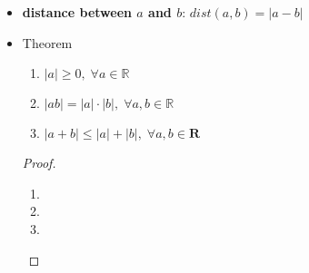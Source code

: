 \documentclass[12pt]{article}
\begin{document}
\begin{enumerate}
\begin{itemize}
\begin{enumerate}
	\item If $0\leq a$ and $0\leq b$ then $0\leq ab$
	\item $\forall a,\; 0\leq a^2$
	\item $0<1$
	\item If $0<a$, then $0< a^{-1}$
	\item If $0<a<b$, then $0<b^{-1}<a^{-1}$
	\\ $\forall a,b,c\in \mathbb{R}$
	\end{enumerate}
	\begin{proof}
	\begin{enumerate}
	\item 
	\end{enumerate}
	\end{proof}
	\item \textbf{distance between $a$ and $b$}: $dist(a,b)=|a-b|$
	\item Theorem
		\begin{enumerate}
		\item $|a|\geq 0,\; \forall a\in \mathbb{R}$
		\item $|ab|=|a|\cdot|b|,\;\forall a,b\in \mathbb{R}$
		\item $|a+b|\leq |a|+|b|,\;\forall a,b \in \textbf{R}$
		\end{enumerate}
		\begin{proof}
		\begin{enumerate}
		\item		
		\item
		\item
		\end{enumerate}
		\end{proof}
	\end{itemize}

	
\end{enumerate}
\end{document}
